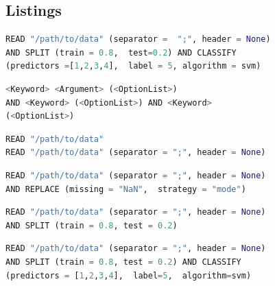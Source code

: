 \clearpage


\subsection{Listings}
\begin{lstlisting}[language=python,  caption={Example of a SML Query Performing Classification.}, label={lst:sml-ex-1}]
READ "/path/to/data" (separator =  ";", header = None) 
AND SPLIT (train = 0.8,  test=0.2) AND CLASSIFY 
(predictors =[1,2,3,4],  label = 5, algorithm = svm) 
\end{lstlisting}


\begin{lstlisting}[language=python,  caption={Here the example \(Query\) in listing \ref{lst:sml-ex-1} is defined in BNF format.}, label={lst:SML:BNFComp}]
<Keyword> <Argument> (<OptionList>) 
AND <Keyword> (<OptionList>) AND <Keyword>
(<OptionList>) 
\end{lstlisting}

\begin{lstlisting}[language=python,  caption={Examples using the \(READ\) \(Keyword\) in SML.}, label={lst:SML:READ}]
READ "/path/to/data" 
READ "/path/to/data" (separator = ";", header = None) 
\end{lstlisting}


\begin{lstlisting}[language=python,  caption={An example utilizing the \(REPLACE\) \(Keyword\) in SML.}, label={lst:SML:REPLACE}]
READ "/path/to/data" (separator = ";", header = None) 
AND REPLACE (missing = "NaN",  strategy = "mode")
\end{lstlisting}

\begin{lstlisting}[language=python,  caption={Example using the \(SPLIT\) \(Keyword\) in SML.}, label={lst:SML:SPLIT}]
READ "/path/to/data" (separator = ";", header = None) 
AND SPLIT (train = 0.8, test = 0.2)
\end{lstlisting}

\begin{lstlisting}[language=python,  caption={Example using the \(CLASSIFY\) \(Keyword\) in SML.  Here we read in data and create training and testing datasets using the \(READ\) and \(SPLIT\) \(Keyword\)s respectively. We then use \(CLASSIFY\) \(Keyword\) with the first 4 columns as features and the 5th column to perform classification using a support vector machine.}, label={lst:SML:CLASSIFY}]
READ "/path/to/data" (separator = ";", header = None) 
AND SPLIT (train = 0.8, test = 0.2) AND CLASSIFY
(predictors = [1,2,3,4],  label=5,  algorithm=svm)
\end{lstlisting}

